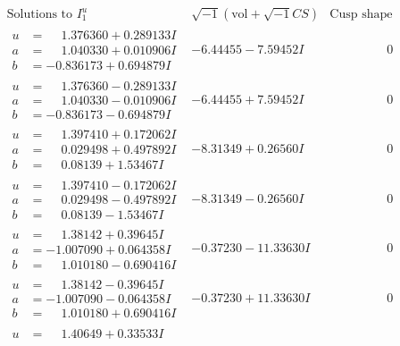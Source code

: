 \documentclass[1p]{elsarticle_modified}
\theoremstyle{definition}
\newcommand{\I}{\sqrt{-1}}
\begin{document}
$$\begin{array}{c|c|c}
\text{Solutions to }I^u_{1}& \I (\text{vol} + \sqrt{-1}CS) & \text{Cusp shape}\\
 \hline 
\begin{aligned}
u &= \phantom{-}1.376360 + 0.289133 I \\
a &= \phantom{-}1.040330 + 0.010906 I \\
b &= -0.836173 + 0.694879 I\end{aligned}
 & -6.44455 - 7.59452 I & \phantom{-0.000000 } 0 \\ \hline\begin{aligned}
u &= \phantom{-}1.376360 - 0.289133 I \\
a &= \phantom{-}1.040330 - 0.010906 I \\
b &= -0.836173 - 0.694879 I\end{aligned}
 & -6.44455 + 7.59452 I & \phantom{-0.000000 } 0 \\ \hline\begin{aligned}
u &= \phantom{-}1.397410 + 0.172062 I \\
a &= \phantom{-}0.029498 + 0.497892 I \\
b &= \phantom{-}0.08139 + 1.53467 I\end{aligned}
 & -8.31349 + 0.26560 I & \phantom{-0.000000 } 0 \\ \hline\begin{aligned}
u &= \phantom{-}1.397410 - 0.172062 I \\
a &= \phantom{-}0.029498 - 0.497892 I \\
b &= \phantom{-}0.08139 - 1.53467 I\end{aligned}
 & -8.31349 - 0.26560 I & \phantom{-0.000000 } 0 \\ \hline\begin{aligned}
u &= \phantom{-}1.38142 + 0.39645 I \\
a &= -1.007090 + 0.064358 I \\
b &= \phantom{-}1.010180 - 0.690416 I\end{aligned}
 & -0.37230 - 11.33630 I & \phantom{-0.000000 } 0 \\ \hline\begin{aligned}
u &= \phantom{-}1.38142 - 0.39645 I \\
a &= -1.007090 - 0.064358 I \\
b &= \phantom{-}1.010180 + 0.690416 I\end{aligned}
 & -0.37230 + 11.33630 I & \phantom{-0.000000 } 0 \\ \hline\begin{aligned}
u &= \phantom{-}1.40649 + 0.33533 I \\

\end{aligned}
\end{array}$$
\end{document}

